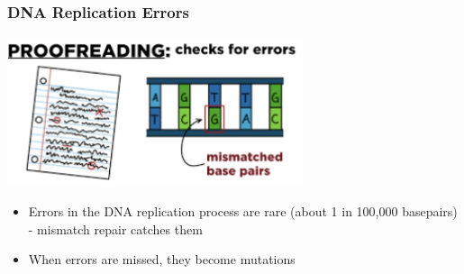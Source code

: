 \documentclass{beamer}
\begin{document}
	\begin{frame}
		\frametitle{DNA Replication Errors}
						\centering \includegraphics[keepaspectratio, width  =0.65\textwidth]{img/DNA_repair} 
			\begin{itemize}
				\item Errors in the DNA replication process are rare (about 1 in 100,000 basepairs) - mismatch repair catches them 
				\item When errors are missed, they become mutations
			\end{itemize}
	\end{frame}
	
	
	
	
	
	
	
\end{document}
